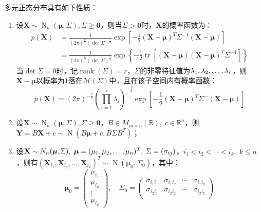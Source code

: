 \begin{property}\label{prop:MultiNormal}
	多元正态分布具有如下性质：
	\begin{enumerate}
		\item 设$\mathbf{X}\sim\operatorname{N}_n(\boldsymbol{\mu},\Sigma),\Sigma\geqslant\mathbf{0}$，则当$\Sigma>\mathbf{0}$时，$\mathbf{X}$的概率函数为：
		\begin{align*}
			p(\mathbf{X})&=\frac{1}{(2\pi)^{\frac{n}{2}}(\det\Sigma)^{\frac{1}{2}}}\exp\left[-\frac{1}{2}(\mathbf{X}-\boldsymbol{\mu})^T\Sigma^{-1}(\mathbf{X}-\boldsymbol{\mu})\right] \\
			&=\frac{1}{(2\pi)^{\frac{n}{2}}(\det\Sigma)^{\frac{1}{2}}}\exp\left\{-\frac{1}{2}\operatorname{tr}[(\mathbf{X}-\boldsymbol{\mu})(\mathbf{X}-\boldsymbol{\mu})^T\Sigma^{-1}]\right\}
		\end{align*}
		当$\det\Sigma=0$时，记$\operatorname{rank}(\Sigma)=r$，$\Sigma$的非零特征值为$\lambda_1, \lambda_2, \dots, \lambda_{r}$，则$\mathbf{X}-\boldsymbol{\mu}$以概率为$1$落在$\mathcal{M}(\Sigma)$中，且在该子空间内有概率函数：
		\begin{equation*}
			p(\mathbf{X})=(2\pi)^{-\frac{r}{2}}\left(\prod\limits_{i=1}^r\lambda_i\right)^{-\frac{1}{2}}\exp\left[-\frac{1}{2}(\mathbf{X}-\boldsymbol{\mu})^T\Sigma^-(\mathbf{X}-\boldsymbol{\mu})\right]
		\end{equation*}
		\item 设$\mathbf{X}\sim\operatorname{N}_n(\boldsymbol{\mu},\Sigma),\Sigma\geqslant\mathbf{0}$，$B\in M_{m\times n}(\mathbb{R}),\;c\in\mathbb{R}^{n}$，则$\mathbf{Y}=B\mathbf{X}+c\sim \operatorname{N}(B\boldsymbol{\mu}+c,B\Sigma B^T)$；
		\item 设$\mathbf{X}\sim N_n(\boldsymbol{\mu},\Sigma),\;\boldsymbol{\mu}=(\mu_1, \mu_2, \dots, \mu_{n})^T,\;\Sigma=(\sigma_{ij})$，$i_1<i_2<\cdots<i_k,\;k\leqslant n$，则有$(\mathbf{X}_{i_1},\mathbf{X}_{i_2},\dots,\mathbf{X}_{i_k})^T\sim \operatorname{N}(\boldsymbol{\mu}_0,\Sigma_0)$，其中：
		\begin{equation*}
			\boldsymbol{\mu}_0=
			\begin{pmatrix}
				\mu_{i_1} \\
				\mu_{i_2} \\
				\vdots \\
				\mu_{i_k}
			\end{pmatrix}
			,\quad
			\Sigma_0=
			\begin{pmatrix}
				\sigma_{i_1i_1} & \sigma_{i_1i_2} & \cdots & \sigma_{i_1i_k} \\
				\sigma_{i_2i_1} & \sigma_{i_2i_2} & \cdots & \sigma_{i_2i_k} \\

\end{pmatrix}
\end{equation*}
\end{enumerate}
\end{property}
